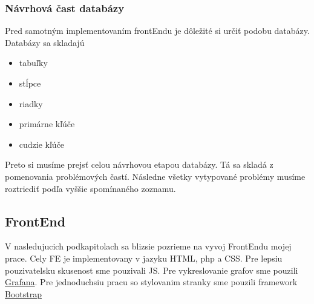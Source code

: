 \subsubsection{Návrhová čast databázy}
Pred samotným implementovaním frontEndu je dôležité si určiť podobu databázy. Databázy sa skladajú
\begin{itemize}
    \item tabuľky   
     \item stĺpce
     \item riadky
     \item primárne kľúče
     \item cudzie kľúče
\end{itemize} 
Preto si musíme prejsť celou návrhovou etapou databázy. Tá sa skladá z pomenovania problémových častí. Následne všetky vytypované problémy musíme roztriediť podľa vyššie spomínaného zoznamu.

\subsection{FrontEnd}
V nasledujucich podkapitolach sa blizsie pozrieme na vyvoj FrontEndu mojej prace. Cely \acs{FE} je implementovany v jazyku \acs{HTML}, \acs{php} a \acs{CSS}. Pre lepsiu pouzivatelsku skusenost sme pouzivali \acl{JS}. Pre vykreslovanie grafov sme pouzili \href{https://grafana.com/}{Grafana}. Pre jednoduchsiu pracu so stylovanim stranky sme pouzili framework \href{https://getbootstrap.com/}{Bootstrap}